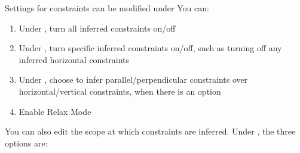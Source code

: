 Settings for constraints can be modified under  You can:


\begin{enumerate}
    \item Under , turn all inferred constraints on/off
    \item Under , turn specific inferred constraints on/off, such as turning off any inferred horizontal constraints
    \item Under , choose to infer parallel/perpendicular constraints over horizontal/vertical constraints, when there is an option
    \item Enable Relax Mode
\end{enumerate}

You can also edit the scope at which constraints are inferred. Under , the three options are:


